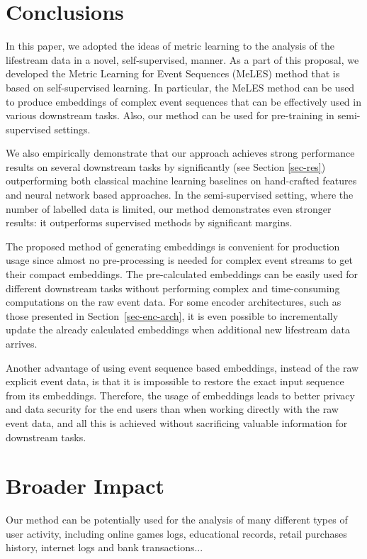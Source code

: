 \documentclass{article}
\begin{document}
\section{Conclusions} \label{sec-conclusions}

In this paper, we adopted the ideas of metric learning to the analysis of the lifestream data in a novel, self-supervised, manner. As a part of this proposal, we developed the Metric Learning for Event Sequences (MeLES) method that is based on self-supervised learning. 
In particular, the MeLES method can be used to produce embeddings of complex event sequences that can be effectively used in various downstream tasks. Also, our method can be used for pre-training in semi-supervised settings.

We also empirically demonstrate that our approach achieves strong performance results on several downstream tasks by significantly (see Section \ref{sec-res}) outperforming both classical machine learning baselines on hand-crafted features and neural network based approaches.
In the semi-supervised setting, where the number of labelled data is limited, our method demonstrates even stronger results: it outperforms supervised methods by significant margins.

The proposed method of generating embeddings is convenient for production usage since almost no pre-processing is needed for complex event streams to get their compact embeddings. The pre-calculated embeddings can be easily used for different downstream tasks without performing complex and time-consuming computations on the raw event data. For some encoder architectures, such as those presented in Section~\ref{sec-enc-arch}, it is even possible to incrementally update the already calculated embeddings when additional new lifestream data arrives.

Another advantage of using event sequence based embeddings, instead of the raw explicit event data, is that it is impossible to restore the exact input sequence from its embeddings. Therefore, the usage of embeddings leads to better privacy and data security for the end users than when working directly with the raw event data, and all this is achieved without sacrificing valuable information for downstream tasks.

\section*{Broader Impact}

Our method can be potentially used for the analysis of many different types of user activity, including online games logs, educational records, retail purchases history, internet logs and bank transactions...
\end{document}
